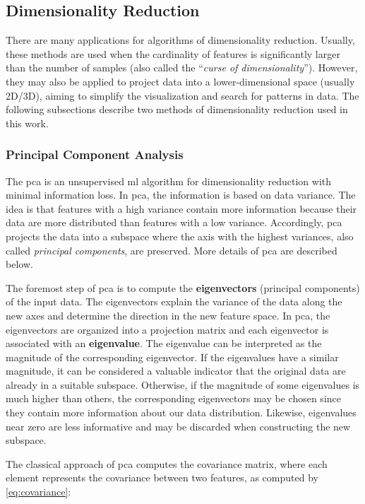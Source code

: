 \subsection{Dimensionality Reduction}

There are many applications for algorithms of dimensionality reduction. Usually, these methods are used when the cardinality of features is significantly larger than the number of samples (also called the ``\textit{curse of dimensionality}''). However, they may also be applied to project data into a lower-dimensional space (usually 2D/3D), aiming to simplify the visualization and search for patterns in data. The following subsections describe two methods of dimensionality reduction used in this work.

\subsubsection{Principal Component Analysis}
\label{sec:pca}

The \acf{pca} \citep{pca} is an unsupervised \acl{ml} algorithm for dimensionality reduction with minimal information loss. In \acs{pca}, the information is based on data variance. The idea is that features with a high variance contain more information because their data are more distributed than features with a low variance. Accordingly, \acs{pca} projects the data into a subspace where the axis with the highest variances, also called \textit{principal components}, are preserved. More details of \acs{pca} are described below.

The foremost step of \acs{pca} is to compute the \textbf{eigenvectors} (principal components) of the input data. The eigenvectors explain the variance of the data along the new axes and determine the direction in the new feature space. In \acs{pca}, the eigenvectors are organized into a projection matrix and each eigenvector is associated with an \textbf{eigenvalue}. The eigenvalue can be interpreted as the magnitude of the corresponding eigenvector. If the eigenvalues have a similar magnitude, it can be considered a valuable indicator that the original data are already in a suitable subspace. Otherwise, if the magnitude of some eigenvalues is much higher than others, the corresponding eigenvectors may be chosen since they contain more information about our data distribution. Likewise, eigenvalues near zero are less informative and may be discarded when constructing the new subspace. 

The classical approach of \acs{pca} \citep{pca} computes the covariance matrix, where each element represents the covariance between two features, as computed by \autoref{eq:covariance}:

